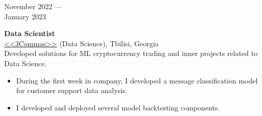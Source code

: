 \documentclass[10pt,a4paper]{article}
\newcommand{\lmpratio}{0.15}
\newcommand{\rmpratio}{0.74}
\newcommand{\vSpace}{0.5cm}
\newcommand{\horizontalSpace}{0.05\textwidth}
\newcommand{\sectionMain}[1]{\textbf{#1}}
\begin{document}
	\begin{minipage}[t]{\lmpratio\textwidth}
		November 2022 --- \\January 2023
	\end{minipage}
	\hspace{\horizontalSpace}
	\begin{minipage}[t]{\rmpratio\textwidth}
		\sectionMain{Data Scientist}\\
		\href{https://3commas.io/}{<<3Commas>>} (Data Science), Tbilisi, Georgia\\[0.1cm]		

Developed solutions for ML cryptocurrency trading and inner projects related to Data Science.

		\begin{itemize}
                \item 
During the first week in company, I developed a message classification model for customer support data analysis.

			\item 
I developed and deployed several model backtesting components.
		\end{itemize}
		
	\end{minipage}	
	\vspace{\vSpace}
\end{document}
